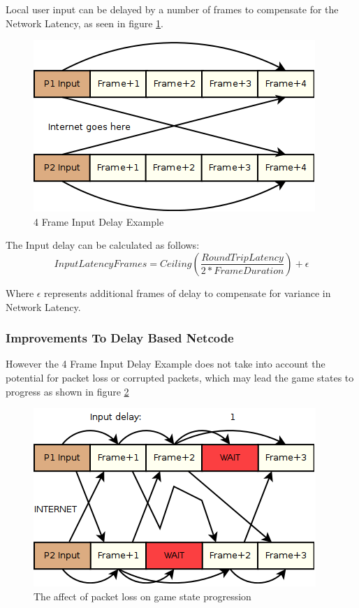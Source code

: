 \documentclass{entcs}
\begin{document}
Local user input can be delayed by a number of frames to compensate for the Network Latency, as seen in figure \ref{fig:InputLatencyEffect}.

\begin{figure}[H]
\centering
\includegraphics{InputDelay}
\caption{4 Frame Input Delay Example \cite{FightingGameNetworking}}
\label{fig:InputLatencyEffect}
\end{figure}

The Input delay can be calculated as follows:\\

\[InputLatencyFrames = Ceiling( \frac{RoundTripLatency}{2 * FrameDuration} ) + \epsilon\]

Where $\epsilon$ represents additional frames of delay to compensate for variance in Network Latency.

\subsubsection{Improvements To Delay Based Netcode}
However the 4 Frame Input Delay Example does not take into account the potential for packet loss or corrupted packets, which may lead the game states to progress as shown in figure \ref{fig:PacketLossEffect}

\begin{figure}[h]
\centering
\includegraphics{PacketLossEffect}
\caption{The affect of packet loss on game state progression \cite{FightingGameNetworking}}
\label{fig:PacketLossEffect}
\end{figure}
\end{document}
